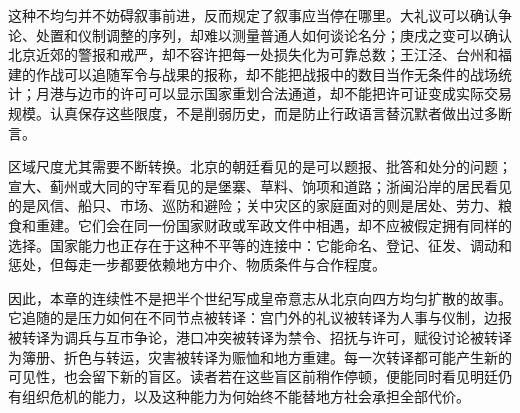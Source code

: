这种不均匀并不妨碍叙事前进，反而规定了叙事应当停在哪里。大礼议可以确认争论、处置和仪制调整的序列，却难以测量普通人如何谈论名分；庚戌之变可以确认北京近郊的警报和戒严，却不容许把每一处损失化为可靠总数；王江泾、台州和福建的作战可以追随军令与战果的报称，却不能把战报中的数目当作无条件的战场统计；月港与边市的许可可以显示国家重划合法通道，却不能把许可证变成实际交易规模。认真保存这些限度，不是削弱历史，而是防止行政语言替沉默者做出过多断言。

区域尺度尤其需要不断转换。北京的朝廷看见的是可以题报、批答和处分的问题；宣大、蓟州或大同的守军看见的是堡寨、草料、饷项和道路；浙闽沿岸的居民看见的是风信、船只、市场、巡防和避险；关中灾区的家庭面对的则是居处、劳力、粮食和重建。它们会在同一份国家财政或军政文件中相遇，却不应被假定拥有同样的选择。国家能力也正存在于这种不平等的连接中：它能命名、登记、征发、调动和惩处，但每走一步都要依赖地方中介、物质条件与合作程度。

因此，本章的连续性不是把半个世纪写成皇帝意志从北京向四方均匀扩散的故事。它追随的是压力如何在不同节点被转译：宫门外的礼议被转译为人事与仪制，边报被转译为调兵与互市争论，港口冲突被转译为禁令、招抚与许可，赋役讨论被转译为簿册、折色与转运，灾害被转译为赈恤和地方重建。每一次转译都可能产生新的可见性，也会留下新的盲区。读者若在这些盲区前稍作停顿，便能同时看见明廷仍有组织危机的能力，以及这种能力为何始终不能替地方社会承担全部代价。